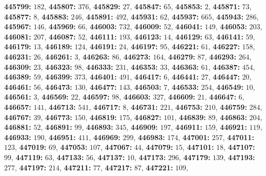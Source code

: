 \textsf{\bfseries 445799:} $182$, \textsf{\bfseries 445807:} $376$, \textsf{\bfseries 445829:} $27$, \textsf{\bfseries 445847:} $65$, \textsf{\bfseries 445853:} $2$, \textsf{\bfseries 445871:} $73$, \textsf{\bfseries 445877:} $8$, \textsf{\bfseries 445883:} $246$, \textsf{\bfseries 445891:} $492$, \textsf{\bfseries 445931:} $62$, \textsf{\bfseries 445937:} $665$, \textsf{\bfseries 445943:} $286$, \textsf{\bfseries 445967:} $146$, \textsf{\bfseries 445969:} $66$, \textsf{\bfseries 446003:} $732$, \textsf{\bfseries 446009:} $52$, \textsf{\bfseries 446041:} $149$, \textsf{\bfseries 446053:} $203$, \textsf{\bfseries 446081:} $207$, \textsf{\bfseries 446087:} $52$, \textsf{\bfseries 446111:} $193$, \textsf{\bfseries 446123:} $14$, \textsf{\bfseries 446129:} $63$, \textsf{\bfseries 446141:} $59$, \textsf{\bfseries 446179:} $13$, \textsf{\bfseries 446189:} $124$, \textsf{\bfseries 446191:} $24$, \textsf{\bfseries 446197:} $95$, \textsf{\bfseries 446221:} $61$, \textsf{\bfseries 446227:} $158$, \textsf{\bfseries 446231:} $26$, \textsf{\bfseries 446261:} $3$, \textsf{\bfseries 446263:} $86$, \textsf{\bfseries 446273:} $164$, \textsf{\bfseries 446279:} $87$, \textsf{\bfseries 446293:} $264$, \textsf{\bfseries 446309:} $23$, \textsf{\bfseries 446323:} $98$, \textsf{\bfseries 446333:} $231$, \textsf{\bfseries 446353:} $33$, \textsf{\bfseries 446363:} $61$, \textsf{\bfseries 446387:} $454$, \textsf{\bfseries 446389:} $59$, \textsf{\bfseries 446399:} $373$, \textsf{\bfseries 446401:} $491$, \textsf{\bfseries 446417:} $6$, \textsf{\bfseries 446441:} $27$, \textsf{\bfseries 446447:} $20$, \textsf{\bfseries 446461:} $56$, \textsf{\bfseries 446473:} $130$, \textsf{\bfseries 446477:} $143$, \textsf{\bfseries 446503:} $7$, \textsf{\bfseries 446533:} $254$, \textsf{\bfseries 446549:} $10$, \textsf{\bfseries 446561:} $3$, \textsf{\bfseries 446569:} $22$, \textsf{\bfseries 446597:} $98$, \textsf{\bfseries 446603:} $327$, \textsf{\bfseries 446609:} $21$, \textsf{\bfseries 446647:} $6$, \textsf{\bfseries 446657:} $141$, \textsf{\bfseries 446713:} $541$, \textsf{\bfseries 446717:} $8$, \textsf{\bfseries 446731:} $221$, \textsf{\bfseries 446753:} $210$, \textsf{\bfseries 446759:} $284$, \textsf{\bfseries 446767:} $39$, \textsf{\bfseries 446773:} $150$, \textsf{\bfseries 446819:} $175$, \textsf{\bfseries 446827:} $101$, \textsf{\bfseries 446839:} $89$, \textsf{\bfseries 446863:} $204$, \textsf{\bfseries 446881:} $52$, \textsf{\bfseries 446891:} $99$, \textsf{\bfseries 446893:} $345$, \textsf{\bfseries 446909:} $197$, \textsf{\bfseries 446911:} $159$, \textsf{\bfseries 446921:} $119$, \textsf{\bfseries 446933:} $190$, \textsf{\bfseries 446951:} $411$, \textsf{\bfseries 446969:} $299$, \textsf{\bfseries 446983:} $174$, \textsf{\bfseries 447001:} $257$, \textsf{\bfseries 447011:} $123$, \textsf{\bfseries 447019:} $69$, \textsf{\bfseries 447053:} $107$, \textsf{\bfseries 447067:} $44$, \textsf{\bfseries 447079:} $15$, \textsf{\bfseries 447101:} $18$, \textsf{\bfseries 447107:} $99$, \textsf{\bfseries 447119:} $63$, \textsf{\bfseries 447133:} $56$, \textsf{\bfseries 447137:} $10$, \textsf{\bfseries 447173:} $296$, \textsf{\bfseries 447179:} $139$, \textsf{\bfseries 447193:} $277$, \textsf{\bfseries 447197:} $214$, \textsf{\bfseries 447211:} $77$, \textsf{\bfseries 447217:} $87$, \textsf{\bfseries 447221:} $109$, 
